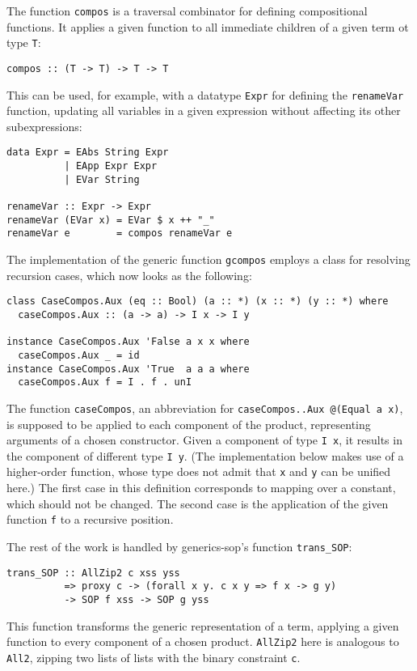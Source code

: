 \documentclass[runningheads]{llncs}
\newcommand{\K}[1]{\lstinline[style=fancy]{#1}}
\begin{document}
The function \K{compos} is a traversal combinator for defining compositional functions. It applies a given function to all immediate children of a given term ot type \K{T}:
\begin{lstlisting}[style=fancy]
compos :: (T -> T) -> T -> T
\end{lstlisting}
This can be used, for example, with a datatype \K{Expr} for defining the \K{renameVar} function, updating all variables in a given expression without affecting its other subexpressions:
\begin{lstlisting}[style=fancy]
data Expr = EAbs String Expr
          | EApp Expr Expr
          | EVar String

renameVar :: Expr -> Expr
renameVar (EVar x) = EVar $ x ++ "_"
renameVar e        = compos renameVar e
\end{lstlisting}

The implementation of the generic function \K{gcompos} employs a class for resolving recursion cases, which now looks as the following:
\begin{lstlisting}[style=fancy]
class CaseCompos.Aux (eq :: Bool) (a :: *) (x :: *) (y :: *) where
  caseCompos.Aux :: (a -> a) -> I x -> I y

instance CaseCompos.Aux 'False a x x where
  caseCompos.Aux _ = id
instance CaseCompos.Aux 'True  a a a where
  caseCompos.Aux f = I . f . unI
\end{lstlisting}
The function \K{caseCompos}, an abbreviation for \K{caseCompos..Aux @(Equal a x)}, is supposed to be applied to each component of the product, representing arguments of a chosen constructor. Given a component of type \K{I x}, it results in the component of different type \K{I y}. (The implementation below makes use of a higher-order function, whose type does not admit that \K{x} and \K{y} can be unified here.) The first case in this definition corresponds to mapping over a constant, which should not be changed. The second case is the application of the given function \K{f} to a recursive position.

The rest of the work is handled by \textsf{generics-sop}'s function \K{trans_SOP}:
\begin{lstlisting}[style=fancy]
trans_SOP :: AllZip2 c xss yss
          => proxy c -> (forall x y. c x y => f x -> g y)
          -> SOP f xss -> SOP g yss
\end{lstlisting}
This function transforms the generic representation of a term, applying a given function to every component of a chosen product. \K{AllZip2} here is analogous to \K{All2}, zipping two lists of lists with the binary constraint \K{c}.
\end{document}
